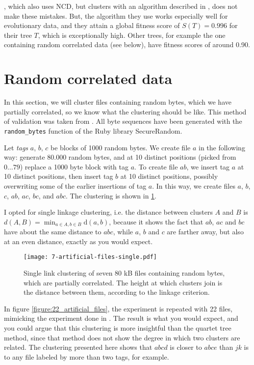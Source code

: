\cite{Cilibrasi2005}, which also uses NCD, but clusters with an algorithm described in \cite{Cilibrasi2011}, does not make these mistakes. But, the algorithm they use works especially well for evolutionary data, and they attain a global fitness score of $S(T) = 0.996$ for their tree $T$, which is exceptionally high. Other trees, for example the one containing random correlated data (see below), have fitness scores of around 0.90.

\section{Random correlated data}

In this section, we will cluster files containing random bytes, which we have partially correlated, so we know what the clustering should be like. This method of validation was taken from \cite{Cilibrasi2005}. All byte sequences have been generated with the \lstinline{random_bytes} function of the Ruby library SecureRandom.

Let \emph{tags} $a$, $b$, $c$ be blocks of 1000 random bytes. We create file $a$ in the following way: generate 80.000 random bytes, and at 10 distinct positions (picked from $0 \dots 79$) replace a 1000 byte block with tag $a$. To create file $ab$, we insert tag $a$ at 10 distinct positions, then insert tag $b$ at 10 distinct positions, possibly overwriting some of the earlier insertions of tag $a$. In this way, we create files $a$, $b$, $c$, $ab$, $ac$, $bc$, and $abc$. The clustering is shown in \ref{figure:7_artificial_files}.

I opted for single linkage clustering, i.e. the distance between clusters $A$ and $B$ is $d(A, B) = \min_{a \in A, b \in B} \text{d}(a, b)$, because it shows the fact that $ab$, $ac$ and $bc$ have about the same distance to $abc$, while $a$, $b$ and $c$ are farther away, but also at an even distance, exactly as you would expect.

\begin{figure}[h!]
  \texttt{[image: 7-artificial-files-single.pdf]}
  \caption{Single link clustering of seven 80 kB files containing random bytes, which are partially correlated. The height at which clusters join is the distance between them, according to the linkage criterion.}
  \label{figure:7_artificial_files}
\end{figure}

In figure \ref{figure:22_artificial_files}, the experiment is repeated with 22 files, mimicking the experiment done in \cite{Cilibrasi2005}. The result is what you would expect, and you could argue that this clustering is more insightful than the quartet tree method, since that method does not show the degree in which two clusters are related. The clustering presented here shows that $abcd$ is closer to $abce$ than $jk$ is to any file labeled by more than two tags, for example.


